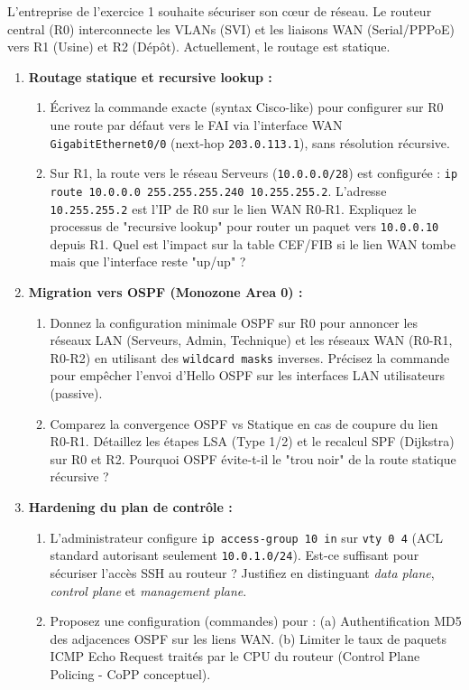\documentclass[11pt]{article}
\begin{document}
\begin{exercice}
L'entreprise de l'exercice 1 souhaite sécuriser son cœur de réseau. Le routeur central (R0) interconnecte les VLANs (SVI) et les liaisons WAN (Serial/PPPoE) vers R1 (Usine) et R2 (Dépôt). Actuellement, le routage est statique.

\begin{enumerate}
    \item \textbf{Routage statique et recursive lookup :} 
    \begin{enumerate}
        \item Écrivez la commande exacte (syntax Cisco-like) pour configurer sur R0 une route par défaut vers le FAI via l'interface WAN \texttt{GigabitEthernet0/0} (next-hop \texttt{203.0.113.1}), sans résolution récursive.
        \item Sur R1, la route vers le réseau Serveurs (\texttt{10.0.0.0/28}) est configurée : \texttt{ip route 10.0.0.0 255.255.255.240 10.255.255.2}. L'adresse \texttt{10.255.255.2} est l'IP de R0 sur le lien WAN R0-R1. Expliquez le processus de "recursive lookup" pour router un paquet vers \texttt{10.0.0.10} depuis R1. Quel est l'impact sur la table CEF/FIB si le lien WAN tombe mais que l'interface reste "up/up" ?
    \end{enumerate}

    \item \textbf{Migration vers OSPF (Monozone Area 0) :} 
    \begin{enumerate}
        \item Donnez la configuration minimale OSPF sur R0 pour annoncer les réseaux LAN (Serveurs, Admin, Technique) et les réseaux WAN (R0-R1, R0-R2) en utilisant des \texttt{wildcard masks} inverses. Précisez la commande pour empêcher l'envoi d'Hello OSPF sur les interfaces LAN utilisateurs (passive).
        \item Comparez la convergence OSPF vs Statique en cas de coupure du lien R0-R1. Détaillez les étapes LSA (Type 1/2) et le recalcul SPF (Dijkstra) sur R0 et R2. Pourquoi OSPF évite-t-il le "trou noir" de la route statique récursive ?
    \end{enumerate}

    \item \textbf{Hardening du plan de contrôle :} 
    \begin{enumerate}
        \item L'administrateur configure \texttt{ip access-group 10 in} sur \texttt{vty 0 4} (ACL standard autorisant seulement \texttt{10.0.1.0/24}). Est-ce suffisant pour sécuriser l'accès SSH au routeur ? Justifiez en distinguant \textit{data plane}, \textit{control plane} et \textit{management plane}.
        \item Proposez une configuration (commandes) pour : (a) Authentification MD5 des adjacences OSPF sur les liens WAN. (b) Limiter le taux de paquets ICMP Echo Request traités par le CPU du routeur (Control Plane Policing - CoPP conceptuel).
    \end{enumerate}
\end{enumerate}
\end{exercice}
\end{document}
